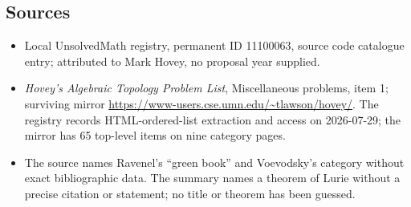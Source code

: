 \documentclass[11pt]{article}
\begin{document}
\subsection{Sources}
\begin{itemize}
\item Local UnsolvedMath registry, permanent ID 11100063, source code catalogue entry; attributed to Mark Hovey, no proposal year supplied.
\item \emph{Hovey's Algebraic Topology Problem List}, Miscellaneous problems, item 1; surviving mirror \url{https://www-users.cse.umn.edu/~tlawson/hovey/}. The registry records HTML-ordered-list extraction and access on 2026-07-29; the mirror has 65 top-level items on nine category pages.
\item The source names Ravenel's ``green book'' and Voevodsky's category without exact bibliographic data. The summary names a theorem of Lurie without a precise citation or statement; no title or theorem has been guessed.
\end{itemize}
\end{document}
